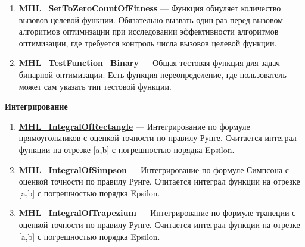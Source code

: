 \documentclass[a4paper,12pt]{article}
\begin{document}
\begin{enumerate}
\item \textbf{\hyperref[MHL_SetToZeroCountOfFitness]{MHL\_SetToZeroCountOfFitness}} --- Функция обнуляет количество вызовов целевой функции. Обязательно вызвать один раз перед вызовом алгоритмов оптимизации при исследовании эффективности    алгоритмов оптимизации, где требуется контроль числа вызовов целевой функции.

\item \textbf{\hyperref[MHL_TestFunction_Binary]{MHL\_TestFunction\_Binary}} --- Общая тестовая функция для задач бинарной оптимизации. Есть функция-переопределение, где пользователь может сам указать тип тестовой функции.

\end{enumerate}

\textbf{Интегрирование}
\begin{enumerate}

\item \textbf{\hyperref[MHL_IntegralOfRectangle]{MHL\_IntegralOfRectangle}} --- Интегрирование по формуле прямоугольников с оценкой точности по правилу Рунге. Считается интеграл функции на отрезке [a,b] с погрешностью порядка Epsilon.

\item \textbf{\hyperref[MHL_IntegralOfSimpson]{MHL\_IntegralOfSimpson}} --- Интегрирование по формуле Симпсона с оценкой точности по правилу Рунге. Считается интеграл функции на отрезке [a,b] с погрешностью порядка Epsilon.

\item \textbf{\hyperref[MHL_IntegralOfTrapezium]{MHL\_IntegralOfTrapezium}} --- Интегрирование по формуле трапеции с оценкой точности по правилу Рунге. Считается интеграл функции на отрезке [a,b] с погрешностью порядка Epsilon.

\end{enumerate}
\end{document}
